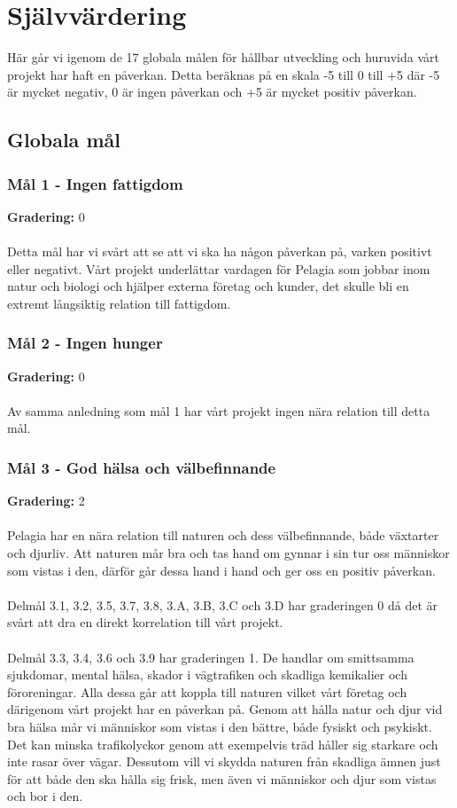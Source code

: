 \section{Självvärdering}
Här går vi igenom de 17 globala målen för hållbar utveckling och huruvida vårt projekt har haft en påverkan. Detta beräknas på en skala -5 till 0 till +5 där -5 är mycket negativ, 0 är ingen påverkan och +5 är mycket positiv påverkan. 

\subsection{Globala mål}

\subsubsection{Mål 1 - Ingen fattigdom}
\textbf{Gradering:} 0 
\\\\
Detta mål har vi svårt att se att vi ska ha någon påverkan på, varken positivt eller negativt. Vårt projekt underlättar vardagen för Pelagia som jobbar inom natur och biologi och hjälper externa företag och kunder, det skulle bli en extremt långsiktig relation till fattigdom. 

\subsubsection{Mål 2 - Ingen hunger}
\textbf{Gradering:} 0 
\\\\
Av samma anledning som mål 1 har vårt projekt ingen nära relation till detta mål. 

\subsubsection{Mål 3 - God hälsa och välbefinnande}
\textbf{Gradering:} 2 
\\\\
Pelagia har en nära relation till naturen och dess välbefinnande, både växtarter och djurliv. Att naturen mår bra och tas hand om gynnar i sin tur oss människor som vistas i den, därför går dessa hand i hand och ger oss en positiv påverkan.
\\\\
Delmål 3.1, 3.2, 3.5, 3.7, 3.8, 3.A, 3.B, 3.C och 3.D har graderingen 0 då det är svårt att dra en direkt korrelation till vårt projekt.
\\\\
Delmål 3.3, 3.4, 3.6 och 3.9 har graderingen 1. De handlar om smittsamma sjukdomar, mental hälsa, skador i vägtrafiken och skadliga kemikalier och föroreningar. Alla dessa går att koppla till naturen vilket vårt företag och därigenom vårt projekt har en påverkan på. Genom att hålla natur och djur vid bra hälsa mår vi människor som vistas i den bättre, både fysiskt och psykiskt. Det kan minska trafikolyckor genom att exempelvis träd håller sig starkare och inte rasar över vägar. Dessutom vill vi skydda naturen från skadliga ämnen just för att både den ska hålla sig frisk, men även vi människor och djur som vistas och bor i den.

